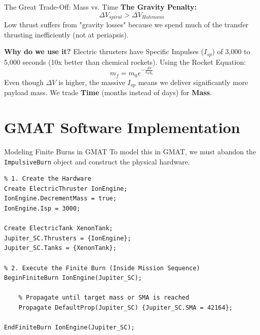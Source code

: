 \documentclass[11pt]{beamer}
\begin{document}
\begin{frame}{The Great Trade-Off: Mass vs. Time}
    \textbf{The Gravity Penalty:}
    \begin{equation}
        \Delta V_{spiral} > \Delta V_{Hohmann}
    \end{equation}
    Low thrust suffers from "gravity losses" because we spend much of the transfer thrusting inefficiently (not at periapsis).
    
    \vspace{0.3cm}
    \textbf{Why do we use it?}
    Electric thrusters have Specific Impulses ($I_{sp}$) of 3,000 to 5,000 seconds (10x better than chemical rockets). Using the Rocket Equation:
    \begin{equation}
        m_f = m_0 e^{-\frac{\Delta V}{I_{sp} g_0}}
    \end{equation}
    Even though $\Delta V$ is higher, the massive $I_{sp}$ means we deliver significantly more payload mass. We trade \textbf{Time} (months instead of days) for \textbf{Mass}.
\end{frame}

\section{GMAT Software Implementation}

\begin{frame}[fragile]{Modeling Finite Burns in GMAT}
    To model this in GMAT, we must abandon the \texttt{ImpulsiveBurn} object and construct the physical hardware.
    
\begin{lstlisting}
% 1. Create the Hardware
Create ElectricThruster IonEngine;
IonEngine.DecrementMass = true;
IonEngine.Isp = 3000;

Create ElectricTank XenonTank;
Jupiter_SC.Thrusters = {IonEngine};
Jupiter_SC.Tanks = {XenonTank};

% 2. Execute the Finite Burn (Inside Mission Sequence)
BeginFiniteBurn IonEngine(Jupiter_SC);
    
    % Propagate until target mass or SMA is reached
    Propagate DefaultProp(Jupiter_SC) {Jupiter_SC.SMA = 42164};
    
EndFiniteBurn IonEngine(Jupiter_SC);
\end{lstlisting}
\end{frame}
\end{document}
